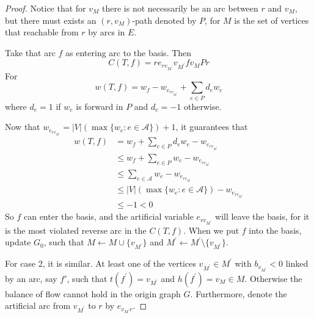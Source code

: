 \begin{proof}
                    Notice that for $v_M$ there is not necessarily be an arc between $r$ and $v_M$, but there must exists an $(r, v_M)$-path denoted by $P$, for $M$ is the set of vertices that reachable from $r$ by arcs in $E$.

                    Take that arc $f$ as entering arc to the basis. Then 
                    \begin{equation*}
                        C(T, f) = re_{rv_{M^\prime}}v_{M^\prime}fv_MPr
                    \end{equation*}
                    For
                    \begin{equation*}
                        w(T, f) = w_f - w_{e_{rv_{M^\prime}}} + \sum_{e \in P} d_e w_e
                    \end{equation*}
                    where $d_e = 1$ if $w_e$ is forward in $P$ and $d_e = -1$ otherwise.

                    Now that $w_{e_{rv_{M^\prime}}} = |V|(\max\{w_e: e\in \mathcal{A}\}) + 1$, it guarantees that
                    \begin{align*}
                        w(T, f) &= w_f + \sum_{e \in P} d_e w_e - w_{e_{rv_{M^\prime}}}\\
                                &\le w_f + \sum_{e \in P}w_e - w_{e_{rv_{M^\prime}}}\\
                                &\le \sum_{e \in \mathcal{A}}w_e - w_{e_{rv_{M^\prime}}}\\
                                &\le |V|(\max\{w_e: e\in \mathcal{A}\}) - w_{e_{rv_{M^\prime}}}\\
                                &\le -1 < 0 
                    \end{align*}
                    So $f$ can enter the basis, and the artificial variable $e_{rv_{M^\prime}}$ will leave the basis, for it is the most violated reverse arc in the $C(T, f)$. When we put $f$ into the basis, update $G_0$, such that $M \leftarrow M \cup \{v_{M^\prime}\}$ and $M^\prime \leftarrow M^\prime \setminus \{v_{M^\prime}\}$.

                    For case 2, it is similar. At least one of the vertices $v_{M^\prime} \in M^\prime$ with $b_{v_{M^\prime}} < 0$ linked by an arc, say $f\prime$, such that $t(f^\prime) = v_{M^\prime}$ and $h(f^\prime) = v_M \in M$. Otherwise the balance of flow cannot hold in the origin graph $G$. Furthermore, denote the artificial arc from $v_{M^\prime}$ to $r$ by $e_{v_{M^\prime}r}$.


\end{proof}
